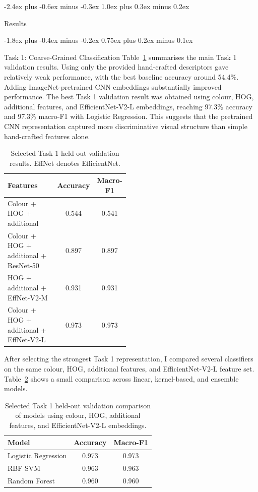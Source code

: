 \documentclass[11pt]{article}
\makeatletter
\renewcommand\section{%
    \@startsection{section}{1}{\z@}%
                  {-2.4ex plus -0.6ex minus -0.3ex}%
                  {1.0ex plus 0.3ex minus 0.2ex}%
                  {\large\bf\raggedright}}
\renewcommand\subsection{%
    \@startsection{subsection}{2}{\z@}%
                  {-1.8ex plus -0.4ex minus -0.2ex}%
                  {0.75ex plus 0.2ex minus 0.1ex}%
                  {\normalsize\bf\raggedright}}
\makeatother
\begin{document}
\section{Results}

\subsection{Task 1: Coarse-Grained Classification}
Table~\ref{tab:task1-results} summarises the main Task 1 validation results. 
Using only the provided hand-crafted descriptors gave relatively weak performance, 
with the best baseline accuracy around 54.4\%. Adding ImageNet-pretrained 
CNN embeddings substantially improved performance. The best Task 1 validation 
result was obtained using colour, HOG, additional features, and EfficientNet-V2-L embeddings, 
reaching 97.3\% accuracy and 97.3\% macro-F1 with Logistic Regression. This suggests that 
the pretrained CNN representation captured more discriminative visual structure than simple hand-crafted features alone.

\begin{table}[h]
\centering
\small
\begin{tabular}{p{0.48\linewidth}cc}
\hline
Features & Accuracy & Macro-F1 \\
\hline
Colour + HOG + additional & 0.544 & 0.541 \\
Colour + HOG + additional + ResNet-50 & 0.897 & 0.897 \\
HOG + additional + EffNet-V2-M & 0.931 & 0.931 \\
Colour + HOG + additional + EffNet-V2-L & 0.973 & 0.973 \\
\hline
\end{tabular}
\caption{Selected Task 1 held-out validation results. EffNet denotes EfficientNet.}
\label{tab:task1-results}
\end{table}

After selecting the strongest Task 1 representation, I compared several classifiers 
on the same colour, HOG, additional features, and EfficientNet-V2-L feature set. 
Table~\ref{tab:task1-models} shows a small comparison across linear, kernel-based, 
and ensemble models.

\begin{table}[h]
\centering
\small
\begin{tabular}{lcc}
\hline
Model & Accuracy & Macro-F1 \\
\hline
Logistic Regression & 0.973 & 0.973 \\
RBF SVM & 0.963 & 0.963 \\
Random Forest & 0.960 & 0.960 \\
\hline
\end{tabular}
\caption{Selected Task 1 held-out validation comparison of models using colour, HOG, additional features, and EfficientNet-V2-L embeddings.}
\label{tab:task1-models}
\end{table}
\end{document}
